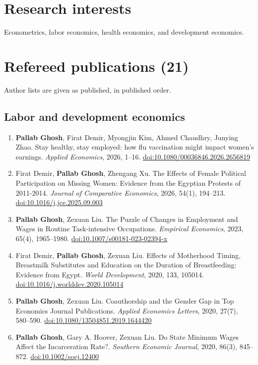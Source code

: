 \documentclass[10.5pt]{article}
\begin{document}
\section{Research interests}
Econometrics, labor economics, health economics, and development economics.
\section{Refereed publications (21)}
{\small Author lists are given as published, in published order.}
\subsection{Labor and development economics}
\begin{enumerate}
\item \textbf{Pallab Ghosh}, Firat Demir, Myongjin Kim, Ahmed Chaudhry, Junying Zhao. Stay healthy, stay employed: how flu vaccination might impact women's earnings. \emph{Applied Economics}, 2026, 1--16. \href{https://doi.org/10.1080/00036846.2026.2656819}{doi:10.1080/00036846.2026.2656819}
\item Firat Demir, \textbf{Pallab Ghosh}, Zhengang Xu. The Effects of Female Political Participation on Missing Women: Evidence from the Egyptian Protests of 2011-2014. \emph{Journal of Comparative Economics}, 2026, 54(1), 194--213. \href{https://doi.org/10.1016/j.jce.2025.09.003}{doi:10.1016/j.jce.2025.09.003}
\item \textbf{Pallab Ghosh}, Zexuan Liu. The Puzzle of Changes in Employment and Wages in Routine Task-intensive Occupations. \emph{Empirical Economics}, 2023, 65(4), 1965--1980. \href{https://doi.org/10.1007/s00181-023-02394-x}{doi:10.1007/s00181-023-02394-x}
\item Firat Demir, \textbf{Pallab Ghosh}, Zexuan Liu. Effects of Motherhood Timing, Breastmilk Substitutes and Education on the Duration of Breastfeeding: Evidence from Egypt. \emph{World Development}, 2020, 133, 105014. \href{https://doi.org/10.1016/j.worlddev.2020.105014}{doi:10.1016/j.worlddev.2020.105014}
\item \textbf{Pallab Ghosh}, Zexuan Liu. Coauthorship and the Gender Gap in Top Economics Journal Publications. \emph{Applied Economics Letters}, 2020, 27(7), 580--590. \href{https://doi.org/10.1080/13504851.2019.1644420}{doi:10.1080/13504851.2019.1644420}
\item \textbf{Pallab Ghosh}, Gary A. Hoover, Zexuan Liu. Do State Minimum Wages Affect the Incarceration Rate?. \emph{Southern Economic Journal}, 2020, 86(3), 845--872. \href{https://doi.org/10.1002/soej.12400}{doi:10.1002/soej.12400}

\end{enumerate}
\end{document}
